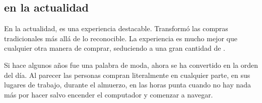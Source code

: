 %
%
%


\subsection{\ecommerceCOM en la actualidad}

En la actualidad, \ecommerceCOM es una experiencia destacable. Transformó las compras tradicionales más allá de lo reconocible. La experiencia es mucho mejor que cualquier otra manera de comprar, seduciendo a una gran cantidad de \ecommerceCOM \lovers.

Si hace algunos años \ecommerceCOM fue una palabra de moda, ahora se ha convertido en la orden del día. Al parecer las personas compran literalmente en cualquier parte, en sus lugares de trabajo, durante el almuerzo, en las horas punta cuando no hay nada más por hacer salvo encender el computador y comenzar a navegar.

